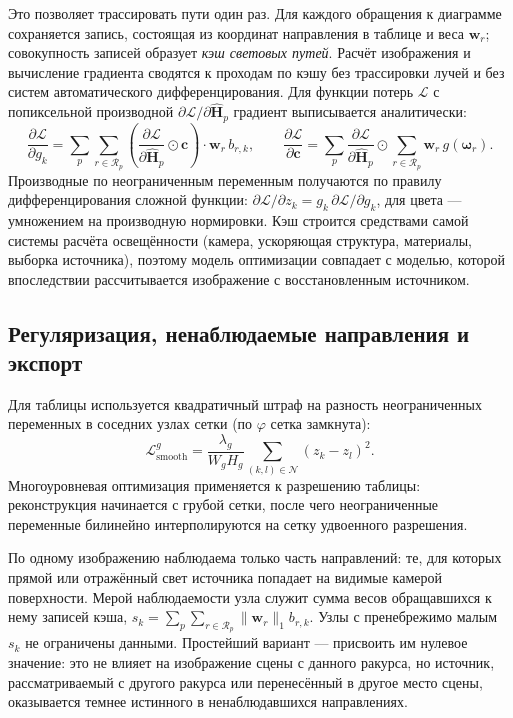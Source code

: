 Это позволяет трассировать пути один раз. Для каждого обращения к диаграмме сохраняется запись, состоящая из координат направления в таблице и веса $\mathbf{w}_r$; совокупность записей образует \emph{кэш световых путей}. Расчёт изображения и вычисление градиента сводятся к проходам по кэшу без трассировки лучей и без систем автоматического дифференцирования. Для функции потерь $\mathcal{L}$ с попиксельной производной $\partial\mathcal{L}/\partial\widehat{\mathbf{H}}_p$ градиент выписывается аналитически:
\begin{equation}
\frac{\partial\mathcal{L}}{\partial g_k}
=
\sum_p
\sum_{r\in\mathcal{R}_p}
\left(
\frac{\partial\mathcal{L}}{\partial\widehat{\mathbf{H}}_p}
\odot\mathbf{c}
\right)
\cdot\mathbf{w}_r\,
b_{r,k},
\qquad
\frac{\partial\mathcal{L}}{\partial\mathbf{c}}
=
\sum_p
\frac{\partial\mathcal{L}}{\partial\widehat{\mathbf{H}}_p}
\odot
\sum_{r\in\mathcal{R}_p}
\mathbf{w}_r\,g(\boldsymbol{\omega}_r).
\end{equation}
Производные по неограниченным переменным получаются по правилу дифференцирования сложной функции: $\partial\mathcal{L}/\partial z_k=g_k\,\partial\mathcal{L}/\partial g_k$, для цвета --- умножением на производную нормировки. Кэш строится средствами самой системы расчёта освещённости (камера, ускоряющая структура, материалы, выборка источника), поэтому модель оптимизации совпадает с моделью, которой впоследствии рассчитывается изображение с восстановленным источником.

\subsection{Регуляризация, ненаблюдаемые направления и экспорт}

Для таблицы используется квадратичный штраф на разность неограниченных переменных в соседних узлах сетки (по $\varphi$ сетка замкнута):
\begin{equation}
\mathcal{L}_{\text{smooth}}^{g}
=
\frac{\lambda_g}{W_gH_g}
\sum_{(k,l)\in\mathcal{N}}
\left(z_k-z_l\right)^2.
\end{equation}
Многоуровневая оптимизация применяется к разрешению таблицы: реконструкция начинается с грубой сетки, после чего неограниченные переменные билинейно интерполируются на сетку удвоенного разрешения.

По одному изображению наблюдаема только часть направлений: те, для которых прямой или отражённый свет источника попадает на видимые камерой поверхности. Мерой наблюдаемости узла служит сумма весов обращавшихся к нему записей кэша, $s_k=\sum_p\sum_{r\in\mathcal{R}_p}\|\mathbf{w}_r\|_1 b_{r,k}$. Узлы с пренебрежимо малым $s_k$ не ограничены данными. Простейший вариант --- присвоить им нулевое значение: это не влияет на изображение сцены с данного ракурса, но источник, рассматриваемый с другого ракурса или перенесённый в другое место сцены, оказывается темнее истинного в ненаблюдавшихся направлениях.

